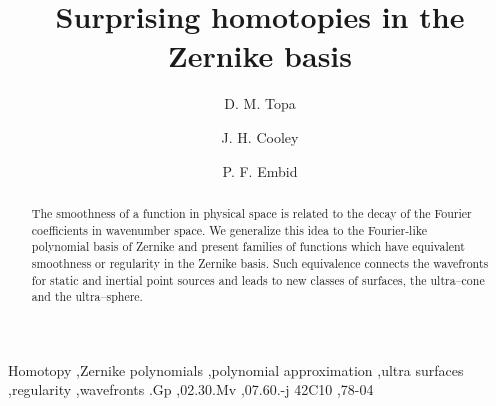 \documentclass[preprint,12pt]{elsarticle}
\begin{document}
\begin{frontmatter}



\title{Surprising homotopies in the Zernike basis}


\author[1,2,3]{D. M. Topa}
\author[1]    {J. H. Cooley}
\author[2]    {P. F. Embid}

\address[1]{Los Alamos National Laboratory, Los Alamos, NM USA}
\address[2]{Department of Mathematics and Statistics, \\University of New Mexico, Albuquerque, NM USA}
\address[3]{Engility Corporation, \\USACE Engineer Research and Development Center, Vicksburg, NM USA}


\begin{abstract}
The smoothness of a function in physical space is related to the decay of the Fourier coefficients in wavenumber space. We generalize this idea to the Fourier-like polynomial basis of Zernike and present families of functions which have equivalent smoothness or regularity in the Zernike basis. Such equivalence connects the wavefronts for static and inertial point sources and leads to new classes of surfaces, the ultra--cone and the ultra--sphere.
\end{abstract}

\begin{keyword}
Homotopy \sep Zernike polynomials \sep polynomial approximation \sep ultra surfaces \sep regularity \sep wavefronts
.Gp \sep 02.30.Mv \sep 07.60.-j
\MSC[2010] 42C10 \sep 78-04
\end{keyword}

\end{frontmatter}
\end{document}
